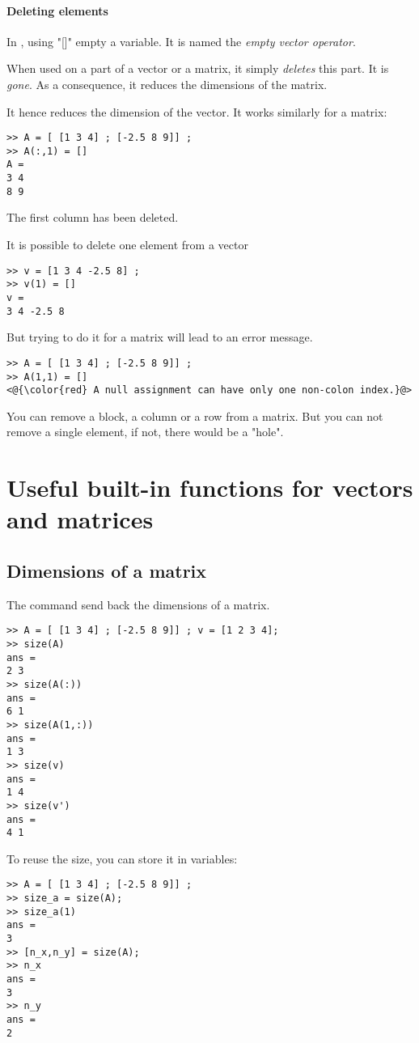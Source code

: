 \paragraph{Deleting elements}




In \matlab, using "[]" empty a variable. It is named the \emph{empty vector operator}.
	
When used on a part of a vector or a matrix, it simply \emph{deletes} this part.
It is \emph{gone}.
As a consequence, it reduces the dimensions of the matrix.



It hence reduces the dimension of the vector. It works similarly for a matrix:
\begin{lstlisting}
>> A = [ [1 3 4] ; [-2.5 8 9]] ;
>> A(:,1) = []
A = 
3 4
8 9
\end{lstlisting}
The first column has been deleted.


It is possible to delete one element from a vector 

\begin{lstlisting}
>> v = [1 3 4 -2.5 8] ;
>> v(1) = []
v = 
3 4 -2.5 8
\end{lstlisting}

But trying to do it for a matrix will lead to an error message.
\begin{lstlisting}
>> A = [ [1 3 4] ; [-2.5 8 9]] ;
>> A(1,1) = []
<@{\color{red} A null assignment can have only one non-colon index.}@>
\end{lstlisting}

You can remove a block, a column or a row from a matrix. 
But you can not remove a single element, if not, there would be a "hole".


\section{Useful built-in functions for vectors and matrices}
\subsection{Dimensions of a matrix}
The command  send back the dimensions of a matrix.
\begin{lstlisting}
>> A = [ [1 3 4] ; [-2.5 8 9]] ; v = [1 2 3 4];
>> size(A)
ans = 
2 3
>> size(A(:))
ans =
6 1
>> size(A(1,:))
ans =
1 3
>> size(v)
ans = 
1 4
>> size(v')
ans = 
4 1
\end{lstlisting}
To reuse the size, you can store it in variables:
\begin{lstlisting}
>> A = [ [1 3 4] ; [-2.5 8 9]] ; 
>> size_a = size(A);
>> size_a(1)
ans =
3
>> [n_x,n_y] = size(A);
>> n_x
ans = 
3
>> n_y
ans = 
2
\end{lstlisting}


